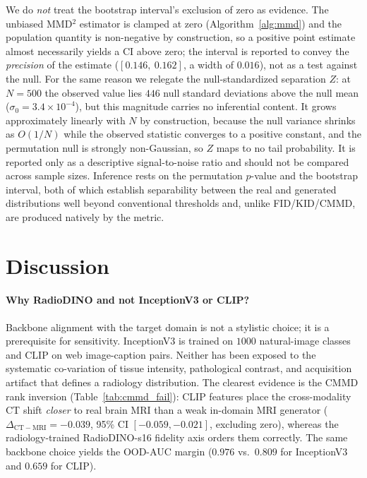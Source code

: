 \documentclass[lettersize,journal]{IEEEtran}
\begin{document}
We do \emph{not} treat the bootstrap interval's exclusion of zero as evidence.
The unbiased MMD$^2$ estimator is clamped at zero
(Algorithm~\ref{alg:mmd}) and the population quantity is non-negative by
construction, so a positive point estimate almost necessarily yields a CI above
zero; the interval is reported to convey the \emph{precision} of the estimate
($[0.146,\ 0.162]$, a width of $0.016$), not as a test against the null.
For the same reason we relegate the null-standardized separation $Z$: at
$N = 500$ the observed value lies $446$ null standard deviations above the null
mean ($\sigma_0 = 3.4\times10^{-4}$), but this magnitude carries no inferential
content. It grows approximately linearly with $N$ by construction, because the
null variance shrinks as $O(1/N)$ while the observed statistic converges to a
positive constant, and the permutation null is strongly non-Gaussian, so $Z$
maps to no tail probability. It is reported only as a descriptive
signal-to-noise ratio and should not be compared across sample sizes.
Inference rests on the permutation
$p$-value and the bootstrap interval, both of which establish separability
between the real and generated distributions well beyond conventional
thresholds and, unlike FID/KID/CMMD, are produced natively by the metric.


\section{Discussion}
\label{sec:discussion}

\paragraph{Why RadioDINO and not InceptionV3 or CLIP?}
Backbone alignment with the target domain is not a stylistic choice; it is a
prerequisite for sensitivity. InceptionV3 is trained on $1000$
natural-image classes and CLIP on web image-caption pairs. Neither has been
exposed to the systematic co-variation of tissue intensity, pathological
contrast, and acquisition artifact that defines a radiology distribution.
The clearest evidence is the CMMD rank inversion (Table~\ref{tab:cmmd_fail}):
CLIP features place the cross-modality CT shift \emph{closer} to real brain MRI
than a weak in-domain MRI generator ($\Delta_{\mathrm{CT}-\mathrm{MRI}}=-0.039$,
95\% CI $[-0.059,-0.021]$, excluding zero), whereas the radiology-trained
RadioDINO-s16 fidelity axis orders them correctly. The same backbone choice
yields the OOD-AUC margin ($0.976$ vs.\ $0.809$ for InceptionV3 and $0.659$ for
CLIP).
\end{document}
